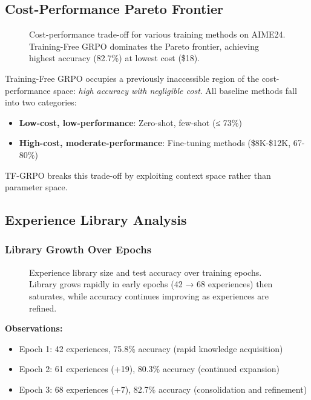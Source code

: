 \subsection{Cost-Performance Pareto Frontier}

\begin{figure}[h]
\centering
{}
\caption{Cost-performance trade-off for various training methods on AIME24. Training-Free GRPO dominates the Pareto frontier, achieving highest accuracy (82.7\%) at lowest cost (\$18).}
\label{fig:pareto}
\end{figure}

Training-Free GRPO occupies a previously inaccessible region of the cost-performance space: \textit{high accuracy with negligible cost}. All baseline methods fall into two categories:
\begin{itemize}
    \item \textbf{Low-cost, low-performance}: Zero-shot, few-shot (≤ 73\%)
    \item \textbf{High-cost, moderate-performance}: Fine-tuning methods (\$8K-\$12K, 67-80\%)
\end{itemize}

TF-GRPO breaks this trade-off by exploiting context space rather than parameter space.

\subsection{Experience Library Analysis}

\subsubsection{Library Growth Over Epochs}

\begin{figure}[h]
\centering
{}
\caption{Experience library size and test accuracy over training epochs. Library grows rapidly in early epochs (42 → 68 experiences) then saturates, while accuracy continues improving as experiences are refined.}
\label{fig:library_growth}
\end{figure}

\textbf{Observations:}
\begin{itemize}
    \item Epoch 1: 42 experiences, 75.8\% accuracy (rapid knowledge acquisition)
    \item Epoch 2: 61 experiences (+19), 80.3\% accuracy (continued expansion)
    \item Epoch 3: 68 experiences (+7), 82.7\% accuracy (consolidation and refinement)
\end{itemize}


